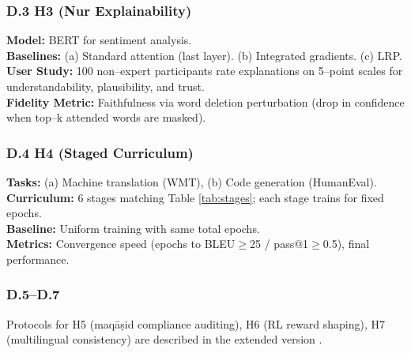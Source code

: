 \documentclass[12pt,twocolumn]{article}
\begin{document}
\subsubsection*{D.3 H3 (Nur Explainability)}
\textbf{Model:} BERT for sentiment analysis. \\
\textbf{Baselines:} (a) Standard attention (last layer). (b) Integrated gradients. (c) LRP. \\
\textbf{User Study:} 100 non--expert participants rate explanations on 5--point scales for understandability, plausibility, and trust.\\
\textbf{Fidelity Metric:} Faithfulness via word deletion perturbation (drop in confidence when top--k attended words are masked).

\subsubsection*{D.4 H4 (Staged Curriculum)}
\textbf{Tasks:} (a) Machine translation (WMT), (b) Code generation (HumanEval). \\
\textbf{Curriculum:} 6 stages matching Table \ref{tab:stages}; each stage trains for fixed epochs. \\
\textbf{Baseline:} Uniform training with same total epochs. \\
\textbf{Metrics:} Convergence speed (epochs to BLEU$\ge$25 / pass@1$\ge$0.5), final performance.

\subsubsection*{D.5--D.7}
Protocols for H5 (maqāṣid compliance auditing), H6 (RL reward shaping), H7 (multilingual consistency) are described in the extended version \citep{FullPaper2025}.
\end{document}
